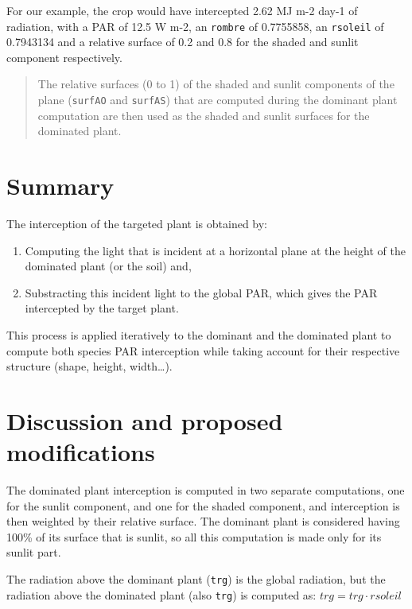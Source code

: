 \documentclass[]{book}
\providecommand{\tightlist}{%
  \setlength{\itemsep}{0pt}\setlength{\parskip}{0pt}}
\theoremstyle{definition}
\theoremstyle{definition}
\theoremstyle{definition}
\theoremstyle{remark}
\begin{document}
For our example, the crop would have intercepted 2.62 MJ m-2 day-1 of
radiation, with a PAR of 12.5 W m-2, an \texttt{rombre} of 0.7755858, an
\texttt{rsoleil} of 0.7943134 and a relative surface of 0.2 and 0.8 for
the shaded and sunlit component respectively.

\begin{quote}
The relative surfaces (0 to 1) of the shaded and sunlit components of
the plane (\texttt{surfAO} and \texttt{surfAS}) that are computed during
the dominant plant computation are then used as the shaded and sunlit
surfaces for the dominated plant.
\end{quote}

\section{Summary}\label{summary}

The interception of the targeted plant is obtained by:

\begin{enumerate}
\def\labelenumi{\arabic{enumi}.}
\tightlist
\item
  Computing the light that is incident at a horizontal plane at the
  height of the dominated plant (or the soil) and,
\item
  Substracting this incident light to the global PAR, which gives the
  PAR intercepted by the target plant.
\end{enumerate}

This process is applied iteratively to the dominant and the dominated
plant to compute both species PAR interception while taking account for
their respective structure (shape, height, width\ldots{}).

\section{Discussion and proposed
modifications}\label{discussion-and-proposed-modifications}

The dominated plant interception is computed in two separate
computations, one for the sunlit component, and one for the shaded
component, and interception is then weighted by their relative surface.
The dominant plant is considered having 100\% of its surface that is
sunlit, so all this computation is made only for its sunlit part.

The radiation above the dominant plant (\texttt{trg}) is the global
radiation, but the radiation above the dominated plant (also
\texttt{trg}) is computed as: \(trg=trg\cdot rsoleil\)
\end{document}
